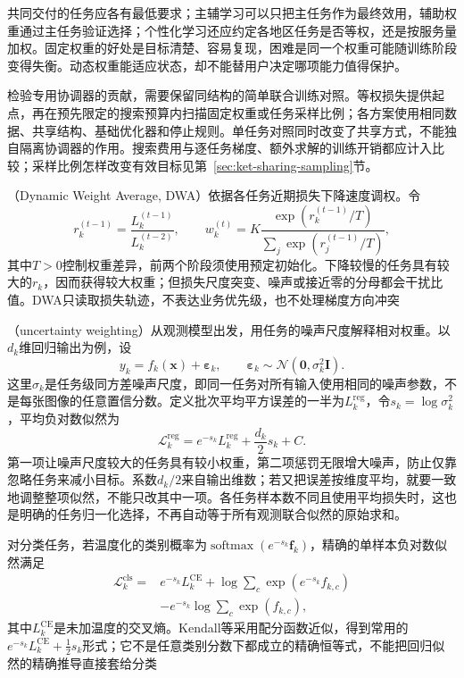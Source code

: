 共同交付的任务应各有最低要求；主辅学习可以只把主任务作为最终效用，辅助权重通过主任务验证选择；个性化学习还应约定各地区任务是否等权，还是按服务量加权。固定权重的好处是目标清楚、容易复现，困难是同一个权重可能随训练阶段变得失衡。动态权重能适应状态，却不能替用户决定哪项能力值得保护。

检验专用协调器的贡献，需要保留同结构的简单联合训练对照。等权损失提供起点，再在预先限定的搜索预算内扫描固定权重或任务采样比例；各方案使用相同数据、共享结构、基础优化器和停止规则。单任务对照同时改变了共享方式，不能独自隔离协调器的作用。搜索费用与逐任务梯度、额外求解的训练开销都应计入比较；采样比例怎样改变有效目标见第~\ref{sec:ket-sharing-sampling}节。

（Dynamic Weight Average, DWA）依据各任务近期损失下降速度调权。令
\[
  r_k^{(t-1)}=\frac{L_k^{(t-1)}}{L_k^{(t-2)}},
  \qquad
  w_k^{(t)}
  =K\frac{\exp(r_k^{(t-1)}/T)}
          {\sum_j\exp(r_j^{(t-1)}/T)},
\]
其中$T>0$控制权重差异，前两个阶段须使用预定初始化。下降较慢的任务具有较大的$r_k$，因而获得较大权重；但损失尺度突变、噪声或接近零的分母都会干扰比值。DWA只读取损失轨迹，不表达业务优先级，也不处理梯度方向冲突

（uncertainty weighting）从观测模型出发，用任务的噪声尺度解释相对权重。以$d_k$维回归输出为例，设
\begin{equation}
  y_k=f_k(\bm x)+\bm\varepsilon_k,
  \qquad
  \bm\varepsilon_k\sim
  \mathcal N(\bm0,\sigma_k^2\bm I).
\end{equation}
这里$\sigma_k$是任务级同方差噪声尺度，即同一任务对所有输入使用相同的噪声参数，不是每张图像的任意置信分数。定义批次平均平方误差的一半为$L_k^{\mathrm{reg}}$，令$s_k=\log\sigma_k^2$，平均负对数似然为
\begin{equation}
  \mathcal L_k^{\mathrm{reg}}
  =e^{-s_k}L_k^{\mathrm{reg}}
   +\frac{d_k}{2}s_k+C.
  \label{eq:ket-sharing-uncertainty-regression}
\end{equation}
第一项让噪声尺度较大的任务具有较小权重，第二项惩罚无限增大噪声，防止仅靠忽略任务来减小目标。系数$d_k/2$来自输出维数；若又把误差按维度平均，就要一致地调整整项似然，不能只改其中一项。各任务样本数不同且使用平均损失时，这也是明确的任务归一化选择，不再自动等于所有观测联合似然的原始求和。

对分类任务，若温度化的类别概率为$\operatorname{softmax}(e^{-s_k}\bm f_k)$，精确的单样本负对数似然满足
\begin{align}
  \mathcal L_k^{\mathrm{cls}}
  ={}&e^{-s_k}L_k^{\mathrm{CE}}
  +\log\sum_c\exp(e^{-s_k}f_{k,c})
  \nonumber\\
  &-e^{-s_k}\log\sum_c\exp(f_{k,c}),
  \label{eq:ket-sharing-uncertainty-classification}
\end{align}
其中$L_k^{\mathrm{CE}}$是未加温度的交叉熵。Kendall等采用配分函数近似，得到常用的$e^{-s_k}L_k^{\mathrm{CE}}+\tfrac12s_k$形式；它不是任意类别分数下都成立的精确恒等式，不能把回归似然的精确推导直接套给分类

